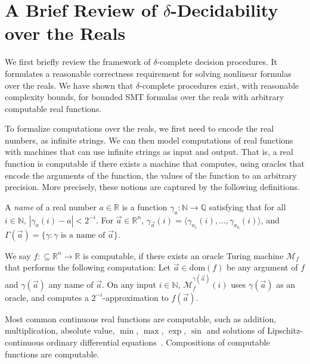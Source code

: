 \documentclass[envcountsect]{llncs}
\newcommand{\dom}{\mathrm{dom}}
\begin{document}
\section{A Brief Review of $\delta$-Decidability over the Reals}\label{review}

We first briefly review the framework of $\delta$-complete decision procedures.
It formulates a reasonable correctness requirement for solving nonlinear
formulas over the reals. We have shown that $\delta$-complete procedures exist,
with reasonable complexity bounds, for bounded SMT formulas over the reals with
arbitrary computable real functions.

To formalize computations over the reals, we first need to encode the real
numbers, as infinite strings. We can then model
computations of real functions with machines that can use infinite strings as
input and output. That is, a real function is computable if there exists a
machine that computes, using oracles that encode the arguments of the function,
the values of the function to an arbitrary precision. More precisely, these
notions are captured by the following definitions.
\begin{definition}
A {\em name} of a real number $a\in \mathbb{R}$ is a function
$\mathcal{\gamma}_a: \mathbb{N}\rightarrow \mathbb{Q}$ satisfying that for all
$i\in \mathbb{N}$, $|\gamma_a(i) - a|<2^{-i}.$ For $\vec a\in \mathbb{R}^n$,
$\gamma_{\vec a}(i) = \langle \gamma_{a_1}(i), ..., \gamma_{a_n}(i)\rangle$, and
$\Gamma(\vec a) = \{\gamma: \gamma\mbox{ is a name of }\vec a\}$.
\end{definition}
\begin{definition} We say
$f:\subseteq\mathbb{R}^n\rightarrow \mathbb{R}$ is computable, if there exists
an oracle Turing machine $\mathcal{M}_f$ that performs the following
computation: Let $\vec a\in \dom(f)$ be any argument of $f$ and $\gamma(\vec a)$
any name of $\vec a$. On any input $i\in \mathbb{N}$,
$\mathcal{M}_f^{\gamma(\vec a)}(i)$ uses $\gamma(\vec a)$ as an oracle, and
computes a $2^{-i}$-approximation to $f(\vec a)$.
\end{definition}
Most common continuous real functions are computable, such as addition,
multiplication,  absolute value, $\min$, $\max$, $\exp$, $\sin$ and solutions of
Lipschitz-continuous ordinary differential equations~\cite{CAbook}. Compositions
of computable functions are computable.
\end{document}
